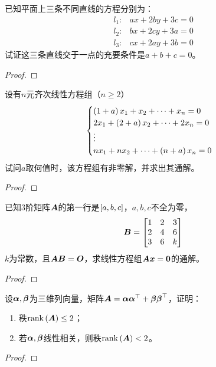\begin{problem}
已知平面上三条不同直线的方程分别为：
\begin{align*}
    l_1: & ax+2by+3c=0 \\
    l_2: & bx+2cy+3a=0 \\
    l_3: & cx+2ay+3b=0
\end{align*}
试证这三条直线交于一点的充要条件是\(a+b+c=0\)。
\end{problem}
\begin{proof}

\end{proof}

\begin{problem}
设有\(n\)元齐次线性方程组（\(n\ge2\)）
\begin{equation*}
    \begin{cases}
        \left( 1+a \right)x_1+x_2+\cdots+x_n=0   \\
        2x_1+\left( 2+a \right)x_2+\cdots+2x_n=0 \\
        \vdots                            \\
        nx_1+nx_2+\cdots+\left( n+a \right)x_n=0
    \end{cases}
\end{equation*}
试问\(a\)取何值时，该方程组有非零解，并求出其通解。
\end{problem}
\begin{proof}

\end{proof}

\setcounter{problem}{13}
\begin{problem}
已知\(3\)阶矩阵\(\boldsymbol{A}\)的第一行是\(\left[ a,b,c \right]\)，\(a,b,c\)不全为零，
\begin{equation*}
    \boldsymbol{B}=
    \begin{bmatrix}
        1 & 2 & 3 \\
        2 & 4 & 6 \\
        3 & 6 & k
    \end{bmatrix}
\end{equation*}
\(k\)为常数，且\(\boldsymbol{A}\boldsymbol{B}=\boldsymbol{O}\)，求线性方程组\(\boldsymbol{A}\boldsymbol{x}=\boldsymbol{0}\)的通解。
\end{problem}
\begin{proof}

\end{proof}

\begin{problem}
设\(\boldsymbol{\alpha},\boldsymbol{\beta}\)为三维列向量，矩阵\(\boldsymbol{A}=\boldsymbol{\alpha}\boldsymbol{\alpha}^\top+\boldsymbol{\beta}\boldsymbol{\beta}^\top\)，证明：
\begin{enumerate}
    \item 秩\(\mathrm{rank}\left( \boldsymbol{A} \right)\le2\)；
    \item 若\(\boldsymbol{\alpha},\boldsymbol{\beta}\)线性相关，则秩\(\mathrm{rank}\left( \boldsymbol{A} \right)<2\)。
\end{enumerate}
\end{problem}
\begin{proof}

\end{proof}

